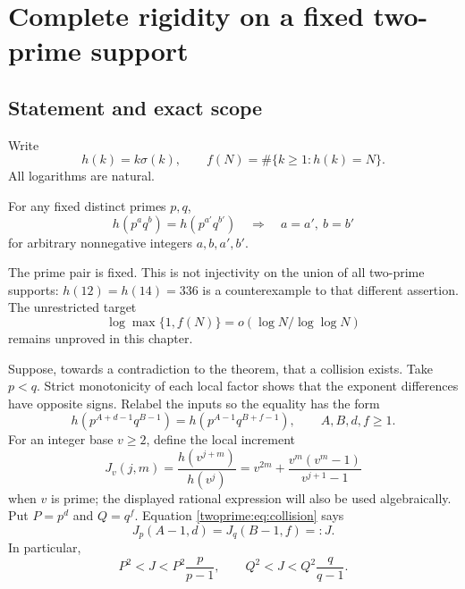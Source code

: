 \chapter{Complete rigidity on a fixed two-prime support}\label{ch:twoprime}
\section{Statement and exact scope}
Write
\[
 h(k)=k\sigma(k),\qquad f(N)=\#\{k\ge1:h(k)=N\}.
\]
All logarithms are natural.
\begin{theorem}\label{twoprime:thm:main}
For any fixed distinct primes $p,q$,
\[
 \boxed{h(p^a q^b)=h(p^{a'}q^{b'})
 \quad\Longrightarrow\quad a=a',\ b=b'}
\]
for arbitrary nonnegative integers $a,b,a',b'$.
\end{theorem}
The prime pair is fixed. This is not injectivity on the union of all two-prime supports: $h(12)=h(14)=336$ is a counterexample to that different assertion. The unrestricted target
\[
 \log\max\{1,f(N)\}=o(\log N/\log\log N)
\]
remains unproved in this chapter.

Suppose, towards a contradiction to the theorem, that a collision exists. Take $p<q$. Strict monotonicity of each local factor shows that the exponent differences have opposite signs. Relabel the inputs so the equality has the form
\begin{equation}\label{twoprime:eq:collision}
 h(p^{A+d-1}q^{B-1})=h(p^{A-1}q^{B+f-1}),
 \qquad A,B,d,f\ge1.
\end{equation}
For an integer base $v\ge2$, define the local increment
\[
 J_v(j,m)=\frac{h(v^{j+m})}{h(v^j)}
 =v^{2m}+\frac{v^m(v^m-1)}{v^{j+1}-1}
\]
when $v$ is prime; the displayed rational expression will also be used algebraically. Put $P=p^d$ and $Q=q^f$. Equation \eqref{twoprime:eq:collision} says
\begin{equation}\label{twoprime:eq:J}
 J_p(A-1,d)=J_q(B-1,f)=:J.
\end{equation}
In particular,
\begin{equation}\label{twoprime:eq:interval}
 P^2<J<P^2\frac p{p-1},\qquad
 Q^2<J<Q^2\frac q{q-1}.
\end{equation}


